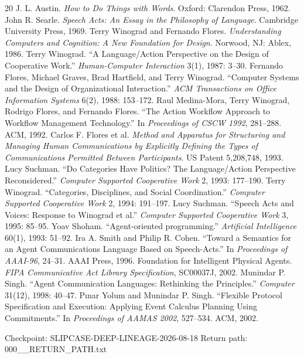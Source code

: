 \documentclass[11pt]{article}
\begin{document}
\begin{thebibliography}{20}
 J. L. Austin. \textit{How to Do Things with Words}. Oxford: Clarendon Press, 1962.
 John R. Searle. \textit{Speech Acts: An Essay in the Philosophy of Language}. Cambridge University Press, 1969.
 Terry Winograd and Fernando Flores. \textit{Understanding Computers and Cognition: A New Foundation for Design}. Norwood, NJ: Ablex, 1986.
 Terry Winograd. ``A Language/Action Perspective on the Design of Cooperative Work.'' \textit{Human-Computer Interaction} 3(1), 1987: 3--30.
 Fernando Flores, Michael Graves, Brad Hartfield, and Terry Winograd. ``Computer Systems and the Design of Organizational Interaction.'' \textit{ACM Transactions on Office Information Systems} 6(2), 1988: 153--172.
 Raul Medina-Mora, Terry Winograd, Rodrigo Flores, and Fernando Flores. ``The Action Workflow Approach to Workflow Management Technology.'' In \textit{Proceedings of CSCW 1992}, 281--288. ACM, 1992.
 Carlos F. Flores et al. \textit{Method and Apparatus for Structuring and Managing Human Communications by Explicitly Defining the Types of Communications Permitted Between Participants}. US Patent 5,208,748, 1993.
 Lucy Suchman. ``Do Categories Have Politics? The Language/Action Perspective Reconsidered.'' \textit{Computer Supported Cooperative Work} 2, 1993: 177--190.
 Terry Winograd. ``Categories, Disciplines, and Social Coordination.'' \textit{Computer Supported Cooperative Work} 2, 1994: 191--197.
 Lucy Suchman. ``Speech Acts and Voices: Response to Winograd et al.'' \textit{Computer Supported Cooperative Work} 3, 1995: 85--95.
 Yoav Shoham. ``Agent-oriented programming.'' \textit{Artificial Intelligence} 60(1), 1993: 51--92.
 Ira A. Smith and Philip R. Cohen. ``Toward a Semantics for an Agent Communications Language Based on Speech-Acts.'' In \textit{Proceedings of AAAI-96}, 24--31. AAAI Press, 1996.
 Foundation for Intelligent Physical Agents. \textit{FIPA Communicative Act Library Specification}, SC00037J, 2002.
 Munindar P. Singh. ``Agent Communication Languages: Rethinking the Principles.'' \textit{Computer} 31(12), 1998: 40--47.
 Pınar Yolum and Munindar P. Singh. ``Flexible Protocol Specification and Execution: Applying Event Calculus Planning Using Commitments.'' In \textit{Proceedings of AAMAS 2002}, 527--534. ACM, 2002.
\end{thebibliography}

\vfill\noindent\footnotesize Checkpoint: SLIPCASE-DEEP-LINEAGE-2026-08-18 \quad Return path: 000\_\_RETURN\_PATH.txt
\end{document}
